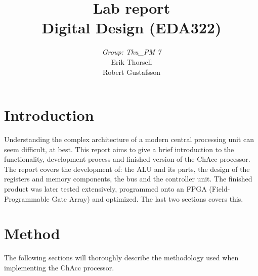 \documentclass[a4paper,11pt]{article}
\begin{document}
\begin{titlepage}

\title{\Huge{Lab report} \\[0.1cm] \Large{Digital Design (EDA322)}}
\author{\large{\emph{Group: Thu\_PM 7}} 
    \\[0.2cm] Erik Thorsell \\[0.05cm] Robert Gustafsson \\[0.1cm]}
\maketitle
\thispagestyle{empty}
\end{titlepage}
\clearpage
\pagestyle{fancyplain}
\tableofcontents
\clearpage
{}
\setcounter{page}{1}

\section{Introduction}
Understanding the complex architecture of a modern central processing unit can 
seem difficult, at best. This report aims to give a brief introduction to 
the functionality, development process and finished version of the ChAcc 
processor. The report covers the development of: the ALU and its parts, 
the design of the registers and memory components, the bus and the controller 
unit. The finished product was later tested extensively, programmed onto an 
FPGA (Field-Programmable Gate Array) and optimized. The last two sections 
covers this.

\section{Method}
The following sections will thoroughly describe the methodology used when 
implementing the ChAcc processor.
\end{document}
